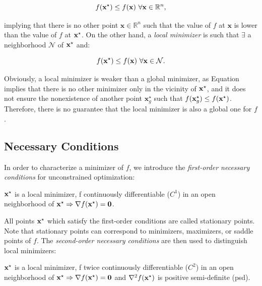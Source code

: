 \begin{equation}
f(\mathbf{x}^{\star}) \le f(\mathbf{x})~\forall \mathbf{x} \in \mathbb R^n,
\end{equation}

\noindent implying that there is no other point $\mathbf{x}\in\mathbb R^n$ such
that the value of $f$ at $\mathbf{x}$ is lower than the value of $f$
at $\mathbf{x}^{\star}$. On the other hand, a \emph{local minimizer} is such
that $\exists$ a neighborhood $\mathcal{N}$ of $\mathbf{x}^{\star}$ and:

\begin{equation}
\label{eq:chap3-local-min}
  f(\mathbf{x}^{\star}) \le f(\mathbf{x})~\forall \mathbf{x} \in \mathcal{N}.
\end{equation}

Obviously, a local minimizer is weaker than a global minimizer, as
Equation  implies that there is no other
minimizer only in the vicinity of $\mathbf{x}^{\star}$, and it does not ensure
the nonexistence of another point $\mathbf{x}^\star_g$ such that
$f(\mathbf{x}^\star_g) \le f(\mathbf{x}^{\star})$. Therefore, there is no
guarantee that the local minimizer is also a global one for $f$.

\subsection{Necessary Conditions}

In order to characterize a minimizer of $f$, we introduce the
\emph{first-order necessary conditions} for unconstrained
optimization:

\begin{theorem}
\label{thm:chap3-first-order-cond}
$\mathbf{x}^{\star}$ is a local minimizer, f continuously differentiable
($C^1$) in an open neighborhood of $\mathbf{x}^{\star} \Rightarrow
\nabla f(\mathbf{x}^{\star}) = \mathbf{0}$.
\end{theorem}

All points $\mathbf{x}^{\star}$ which satisfy the first-order conditions are
called stationary points. Note that stationary points can correspond
to minimizers, maximizers, or saddle points of $f$. The
\emph{second-order necessary conditions} are then used to distinguish
local minimizers:

\begin{theorem}
\label{thm:chap3-second-order-cond}
$\mathbf{x}^{\star}$ is a local minimizer, f twice continuously differentiable
($C^2$) in an open neighborhood of $\mathbf{x}^{\star} \Rightarrow \nabla
f(\mathbf{x}^{\star}) = \mathbf{0}$ and $\nabla^2 f(\mathbf{x}^{\star})$ is positive
semi-definite (psd).
\end{theorem}

